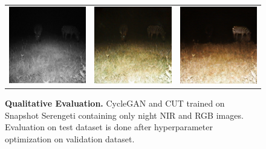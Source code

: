 \documentclass[a4paper,11pt, DIV=12]{scrartcl}
\begin{document}
\begin{figure}[ht]
\begin{tabularx}{.69\textwidth}{>{\centering\arraybackslash}X >{\centering\arraybackslash}X >{\centering\arraybackslash}X}
      \includegraphics{S2_D08_R1_PICT0080_real.png} & \includegraphics{S2_D08_R1_PICT0080_cyclegan.png} & \includegraphics{S2_D08_R1_PICT0080_cut.png} \\
   \end{tabularx}
   \caption{
      \textbf{Qualitative Evaluation.} CycleGAN and CUT trained on Snapshot Serengeti \cite{serengeti} containing only night NIR and RGB images.
      Evaluation on test dataset is done after hyperparameter optimization on validation dataset.
   }
   \label{fig:network-comparison-qual}
\end{figure}
\end{document}
